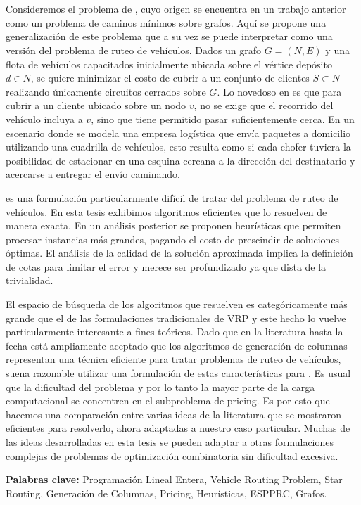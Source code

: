 \chapter*{\runtitulo}

\noindent Consideremos el problema de , cuyo origen se encuentra en un trabajo anterior como un problema de caminos mínimos sobre grafos. Aquí se propone una generalización de este problema que a su vez se puede interpretar como una versión del problema de ruteo de vehículos. Dados un grafo $G = (N, E)$ y una flota de vehículos capacitados inicialmente ubicada sobre el vértice depósito $d \in N$, se quiere minimizar el costo de cubrir a un conjunto de clientes $S \subset N$ realizando únicamente circuitos cerrados sobre $G$. Lo novedoso en  es que para cubrir a un cliente ubicado sobre un nodo $v$, no se exige que el recorrido del vehículo incluya a $v$, sino que tiene permitido pasar suficientemente cerca. En un escenario donde se modela una empresa logística que envía paquetes a domicilio utilizando una cuadrilla de vehículos, esto resulta como si cada chofer tuviera la posibilidad de estacionar en una esquina cercana a la dirección del destinatario y acercarse a entregar el envío caminando.

 es una formulación particularmente difícil de tratar del problema de ruteo de vehículos. En esta tesis exhibimos algoritmos eficientes que lo resuelven de manera exacta. En un análisis posterior se proponen heurísticas que permiten procesar instancias más grandes, pagando el costo de prescindir de soluciones óptimas. El análisis de la calidad de la solución aproximada implica la definición de cotas para limitar el error y merece ser profundizado ya que dista de la trivialidad.

El espacio de búsqueda de los algoritmos que resuelven  es categóricamente más grande que el de las formulaciones tradicionales de VRP y este hecho lo vuelve particularmente interesante a fines teóricos. Dado que en la literatura hasta la fecha está ampliamente aceptado que los algoritmos de generación de columnas representan una técnica eficiente para tratar problemas de ruteo de vehículos, suena razonable utilizar una formulación de estas características para . Es usual que la dificultad del problema y por lo tanto la mayor parte de la carga computacional se concentren en el subproblema de pricing. Es por esto que hacemos una comparación entre varias ideas de la literatura que se mostraron eficientes para resolverlo, ahora adaptadas a nuestro caso particular. Muchas de las ideas desarrolladas en esta tesis se pueden adaptar a otras formulaciones complejas de problemas de optimización combinatoria sin dificultad excesiva. 

\bigskip

\noindent\textbf{Palabras clave:} Programación Lineal Entera, Vehicle Routing Problem, Star Routing, Generación de Columnas, Pricing, Heurísticas, ESPPRC, Grafos.	
